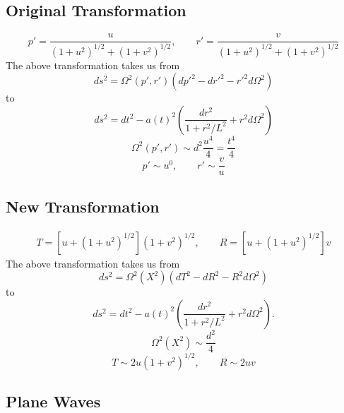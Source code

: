 \documentclass[10pt,letterpaper]{article}
\begin{document}
\subsection*{Original Transformation}
\begin{equation}
p' = \frac{ u}{(1+u^2)^{1/2}+(1+v^2)^{1/2}},\qquad r' = \frac{v}{(1+u^2)^{1/2}+(1+v^2)^{1/2}}
\end{equation}
The above transformation takes us from
\begin{equation}
ds^2 = \Omega^2(p',r')( dp'^2 - dr'^2 - r'^2 d\Omega^2)
\end{equation}
to
\begin{equation}
ds^2 = dt^2 - a(t)^2 \left( \frac{dr^2}{1+r^2/L^2} + r^2 d\Omega^2 \right) 
\end{equation}
\begin{equation}
\Omega^2(p',r') \sim d^2 \frac{u^4}{4} = \frac{t^4}{4}
\end{equation}
\begin{equation}
p' \sim u^0,\qquad r' \sim \frac{v}{u}
\end{equation}
\subsection*{New Transformation}
\begin{align}
T = \left[u+(1+u^2)^{1/2}\right]( 1+v^2)^{1/2},\qquad R = \left[u+(1+u^2)^{1/2}\right]v
\end{align}
The above transformation takes us from
\begin{equation}
ds^2 = \Omega^2(X^2)( dT^2 - dR^2 - R^2 d\Omega^2)
\end{equation}
to
\begin{equation}
ds^2 = dt^2 - a(t)^2 \left( \frac{dr^2}{1+r^2/L^2} + r^2 d\Omega^2 \right) .
\end{equation}
\begin{equation}
\Omega^2(X^2) \sim \frac{d^2}{4}
\end{equation}
\begin{equation}
T \sim  2u (1+v^2)^{1/2},\qquad R \sim 2uv 
\end{equation}
\subsection*{Plane Waves}
\end{document}
